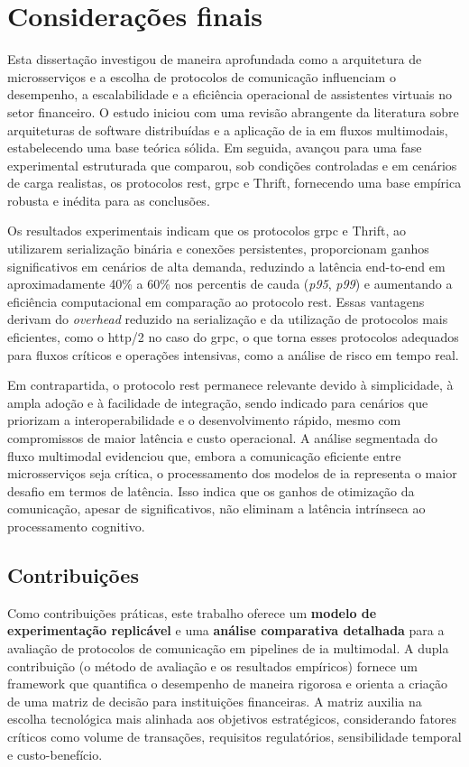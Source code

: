 \chapter{Considerações finais}
\label{ch:6conclusoes}

Esta dissertação investigou de maneira aprofundada como a arquitetura de microsserviços e a escolha de protocolos de comunicação influenciam o desempenho, a escalabilidade e a eficiência operacional de assistentes virtuais no setor financeiro. O estudo iniciou com uma revisão abrangente da literatura sobre arquiteturas de software distribuídas e a aplicação de \acrfull{ia} em fluxos multimodais, estabelecendo uma base teórica sólida. Em seguida, avançou para uma fase experimental estruturada que comparou, sob condições controladas e em cenários de carga realistas, os protocolos \gls{rest}, \gls{grpc} e Thrift, fornecendo uma base empírica robusta e inédita para as conclusões.

Os resultados experimentais indicam que os protocolos \gls{grpc} e Thrift, ao utilizarem serialização binária e conexões persistentes, proporcionam ganhos significativos em cenários de alta demanda, reduzindo a latência end-to-end em aproximadamente 40\% a 60\% nos percentis de cauda (\textit{p95}, \textit{p99}) e aumentando a eficiência computacional em comparação ao protocolo \gls{rest}. Essas vantagens derivam do \textit{overhead} reduzido na serialização e da utilização de protocolos mais eficientes, como o \acrshort{http}/2 no caso do \gls{grpc}, o que torna esses protocolos adequados para fluxos críticos e operações intensivas, como a análise de risco em tempo real.

Em contrapartida, o protocolo \gls{rest} permanece relevante devido à simplicidade, à ampla adoção e à facilidade de integração, sendo indicado para cenários que priorizam a interoperabilidade e o desenvolvimento rápido, mesmo com compromissos de maior latência e custo operacional. A análise segmentada do fluxo multimodal evidenciou que, embora a comunicação eficiente entre microsserviços seja crítica, o processamento dos modelos de \gls{ia} representa o maior desafio em termos de latência. Isso indica que os ganhos de otimização da comunicação, apesar de significativos, não eliminam a latência intrínseca ao processamento cognitivo.

\section{Contribuições}
Como contribuições práticas, este trabalho oferece um \textbf{modelo de experimentação replicável} e uma \textbf{análise comparativa detalhada} para a avaliação de protocolos de comunicação em pipelines de \acrfull{ia} multimodal. A dupla contribuição (o método de avaliação e os resultados empíricos) fornece um framework que quantifica o desempenho de maneira rigorosa e orienta a criação de uma matriz de decisão para instituições financeiras. A matriz auxilia na escolha tecnológica mais alinhada aos objetivos estratégicos, considerando fatores críticos como volume de transações, requisitos regulatórios, sensibilidade temporal e custo-benefício.

